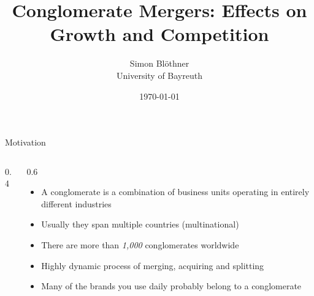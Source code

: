 \documentclass[aspectratio=169]{beamer}
\title{Conglomerate Mergers: \newline Effects on
Growth and Competition}
\author{Simon Bl\"othner \\
  \small University of Bayreuth
}
\date{\today}
\begin{document}
\maketitle

\begin{frame}{Motivation}
  \begin{columns}[T]
    \begin{column}{0.4\textwidth}
      
    \end{column}
    \begin{column}{0.6\textwidth}
      \begin{itemize}
        \setlength\itemsep{0.8em}
        \item A conglomerate is a combination of business units operating in entirely different industries
        \item Usually they span multiple countries (multinational)
        \item There are more than \textit{1,000} conglomerates worldwide
        \item Highly dynamic process of merging, acquiring and splitting
        \item Many of the brands you use daily probably belong to a conglomerate
      \end{itemize}
    \end{column}
    
  \end{columns}
       
\end{frame}
\end{document}
